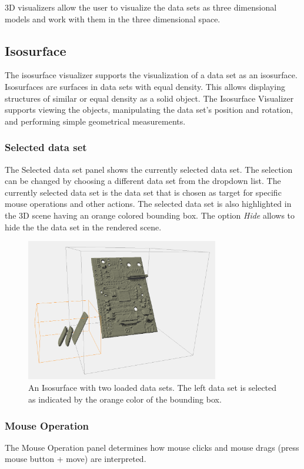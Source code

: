 
3D visualizers allow the user to visualize the data sets as three dimensional models and work with them in the three dimensional space.

\subsection{Isosurface}

The isosurface visualizer supports the visualization of a data set as an isosurface. Isosurfaces are
surfaces in data sets with equal density. This allows displaying structures of
similar or equal density as a solid object.
The Isosurface Visualizer supports viewing the objects, manipulating the data set's position and rotation, and performing simple geometrical measurements.

\subsubsection{Selected data set}
The Selected data set panel shows the currently selected data set. The selection can be changed by choosing a different data set from the dropdown list.
The currently selected data set is the data set that is chosen as target for specific mouse operations and other actions.
The selected data set is also highlighted in the 3D scene having an orange colored bounding box.
The option \emph{Hide} allows to hide the the data set in the rendered scene.

\begin{figure}[h!]
  \centering
  \includegraphics[width=0.75\textwidth]{img/selecteddataset.png}
  \caption{An Isosurface with two loaded data sets. The left data set is selected as indicated by the orange color of the bounding box.}
\end{figure}

\subsubsection{Mouse Operation}\label{sec:mouseoperation}
The Mouse Operation panel determines how mouse clicks and mouse drags (press mouse button + move) are interpreted.

